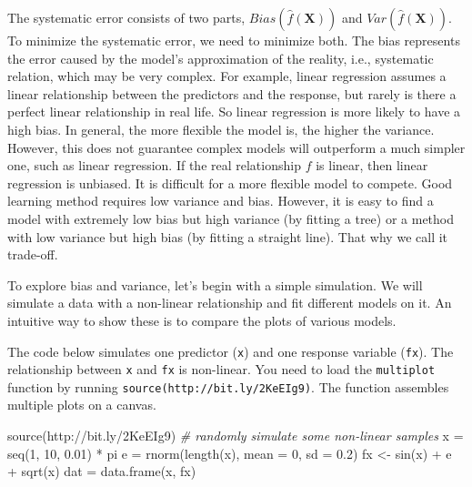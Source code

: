 \documentclass[
  12pt,
]{krantz}
\makeatletter
\newenvironment{Shaded}{\begin{snugshade}}{\end{snugshade}}
\newcommand{\AttributeTok}[1]{\textcolor[rgb]{0.61,0.61,0.61}{#1}}
\newcommand{\CommentTok}[1]{\textcolor[rgb]{0.37,0.37,0.37}{\textit{#1}}}
\newcommand{\DecValTok}[1]{\textcolor[rgb]{0.06,0.06,0.06}{#1}}
\newcommand{\FloatTok}[1]{\textcolor[rgb]{0.06,0.06,0.06}{#1}}
\newcommand{\FunctionTok}[1]{\textcolor[rgb]{0,0,0}{#1}}
\newcommand{\NormalTok}[1]{#1}
\newcommand{\OtherTok}[1]{\textcolor[rgb]{0.37,0.37,0.37}{#1}}
\newcommand{\SpecialCharTok}[1]{\textcolor[rgb]{0,0,0}{#1}}
\newcommand{\StringTok}[1]{\textcolor[rgb]{0.5,0.5,0.5}{#1}}
\newenvironment{kframe}{%
\medskip{}
\setlength{\fboxsep}{.8em}
 \def\at@end@of@kframe{}%
 \ifinner\ifhmode%
  \def\at@end@of@kframe{\end{minipage}}%
  \begin{minipage}{\columnwidth}%
 \fi\fi%
 \def\FrameCommand##1{\hskip\@totalleftmargin \hskip-\fboxsep
 \colorbox{shadecolor}{##1}\hskip-\fboxsep
     \hskip-\linewidth \hskip-\@totalleftmargin \hskip\columnwidth}%
 \MakeFramed {\advance\hsize-\width
   \@totalleftmargin\z@ \linewidth\hsize
   \@setminipage}}%
 {\par\unskip\endMakeFramed%
 \at@end@of@kframe}
\renewenvironment{Shaded}{\begin{kframe}}{\end{kframe}}
\makeatother
\begin{document}
The systematic error consists of two parts, \(Bias(\hat{f}(\mathbf{X}))\) and \(Var (\hat{f}(\mathbf{X}))\). To minimize the systematic error, we need to minimize both. The bias represents the error caused by the model's approximation of the reality, i.e., systematic relation, which may be very complex. For example, linear regression assumes a linear relationship between the predictors and the response, but rarely is there a perfect linear relationship in real life. So linear regression is more likely to have a high bias. In general, the more flexible the model is, the higher the variance. However, this does not guarantee complex models will outperform a much simpler one, such as linear regression. If the real relationship \(f\) is linear, then linear regression is unbiased. It is difficult for a more flexible model to compete. Good learning method requires low variance and bias. However, it is easy to find a model with extremely low bias but high variance (by fitting a tree) or a method with low variance but high bias (by fitting a straight line). That why we call it trade-off.

To explore bias and variance, let's begin with a simple simulation. We will simulate a data with a non-linear relationship and fit different models on it. An intuitive way to show these is to compare the plots of various models.

The code below simulates one predictor (\texttt{x}) and one response variable (\texttt{fx}). The relationship between \texttt{x} and \texttt{fx} is non-linear. You need to load the \texttt{multiplot} function by running \texttt{source(\textquotesingle{}http://bit.ly/2KeEIg9\textquotesingle{})}. The function assembles multiple plots on a canvas.

\begin{Shaded}
\begin{Highlighting}[]
\FunctionTok{source}\NormalTok{(}\StringTok{\textquotesingle{}http://bit.ly/2KeEIg9\textquotesingle{}}\NormalTok{)}
\CommentTok{\# randomly simulate some non{-}linear samples}
\NormalTok{x }\OtherTok{=} \FunctionTok{seq}\NormalTok{(}\DecValTok{1}\NormalTok{, }\DecValTok{10}\NormalTok{, }\FloatTok{0.01}\NormalTok{) }\SpecialCharTok{*}\NormalTok{ pi}
\NormalTok{e }\OtherTok{=} \FunctionTok{rnorm}\NormalTok{(}\FunctionTok{length}\NormalTok{(x), }\AttributeTok{mean =} \DecValTok{0}\NormalTok{, }\AttributeTok{sd =} \FloatTok{0.2}\NormalTok{)}
\NormalTok{fx }\OtherTok{\textless{}{-}} \FunctionTok{sin}\NormalTok{(x) }\SpecialCharTok{+}\NormalTok{ e }\SpecialCharTok{+} \FunctionTok{sqrt}\NormalTok{(x)}
\NormalTok{dat }\OtherTok{=} \FunctionTok{data.frame}\NormalTok{(x, fx)}
\end{Highlighting}
\end{Shaded}
\end{document}
